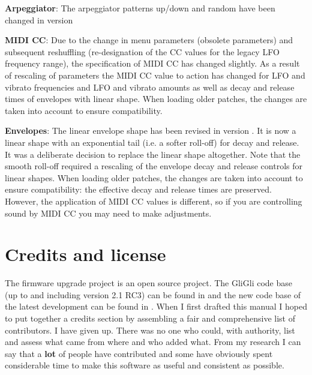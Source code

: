 \documentclass[landscape, 11pt, oneside, twoside]{report}
\newenvironment{flowtext}{\addmargin[0cm]{0cm}}{\endaddmargin} %
\begin{document}
\begin{flowtext}
\textbf{Arpeggiator}: The arpeggiator patterns up/down and random have been changed in version \version

\textbf{MIDI CC}: Due to the change in menu parameters (obsolete parameters) and subsequent reshuffling (re-designation of the CC values for the legacy LFO frequency range), the specification of MIDI CC has changed slightly. As a result of rescaling of parameters the MIDI CC value to action has changed for LFO and vibrato frequencies and LFO and vibrato amounts as well as decay and release times of envelopes with linear shape. When loading older patches, the changes are taken into account to ensure compatibility.

\textbf{Envelopes}: The linear envelope shape has been revised in version \version. It is now a linear shape with an exponential tail (i.e. a softer roll-off) for decay and release. It was a deliberate decision to replace the linear shape altogether. Note that the smooth roll-off required a rescaling of the envelope decay and release controls for linear shapes. When loading older patches, the changes are taken into account to ensure compatibility: the effective decay and release times are preserved. However, the application of MIDI CC values is different, so if you are controlling sound by MIDI CC you may need to make adjustments.

\section{Credits and license}

The firmware upgrade project is an open source project. The GliGli code base (up to and including version 2.1 RC3) can be found in \cite{gligli} and the new code base of the latest development can be found in \cite{imogen}. When I first drafted this manual I hoped to put together a credits section by assembling a fair and comprehensive list of contributors. I have given up. There was no one who could, with authority, list and assess what came from where and who added what. From my research I can say that a \textbf{lot} of people have contributed and some have obviously spent considerable time to make this software as useful and consistent as possible. 


\end{flowtext}
\end{document}

